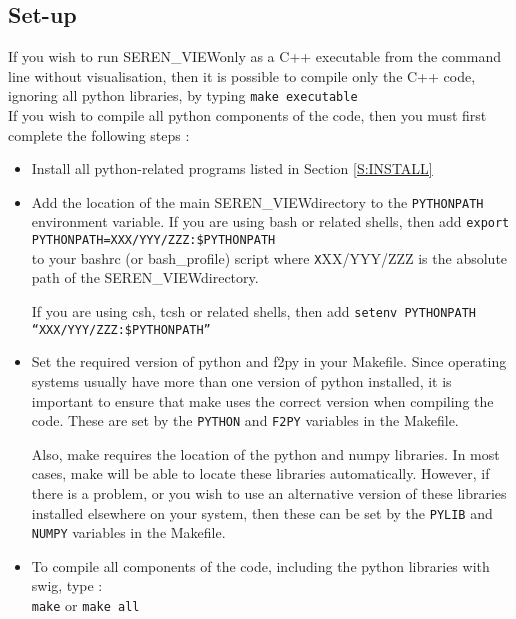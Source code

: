 \documentclass[a4paper]{article}
\newcommand{\CODENAME}{SEREN\_VIEW}
\newcommand{\var}[1]{\texttt{#1}}
\begin{document}
\subsection{Set-up}

If you wish to run \CODENAME only as a C++ executable from the command line without visualisation, then it is possible to compile only the C++ code, ignoring all python libraries, by typing 
\newline
\noindent \var{make executable} \\


If you wish to compile all python components of the code, then you must first complete the following steps : 
\begin{itemize}

\item Install all python-related programs listed in Section \ref{S:INSTALL}

\item Add the location of the main \CODENAME directory to the \var{PYTHONPATH} environment variable.  If you are using bash or related shells, then add 
\newline
\noindent \var{export PYTHONPATH=XXX/YYY/ZZZ:\$PYTHONPATH} \\

to your bashrc (or bash\_profile) script where {\var XXX/YYY/ZZZ} is the absolute path of the \CODENAME directory.  

If you are using csh, tcsh or related shells, then add
\newline
\noindent \var{setenv PYTHONPATH ``XXX/YYY/ZZZ:\$PYTHONPATH''} \\

\item Set the required version of python and f2py in your Makefile.  Since operating systems usually have more than one version of python installed, it is important to ensure that make uses the correct version when compiling the code.  These are set by the \var{PYTHON} and \var{F2PY} variables in the Makefile.

Also, make requires the location of the python and numpy libraries.  In most cases, make will be able to locate these libraries automatically.  However, if there is a problem, or you wish to use an alternative version of these libraries installed elsewhere on your system, then these can be set by the \var{PYLIB} and \var{NUMPY} variables in the Makefile.  


\item To compile all components of the code, including the python libraries with swig, type : \\
\newline
\noindent \var{make} or \var{make all} \\

\end{itemize}
\end{document}
